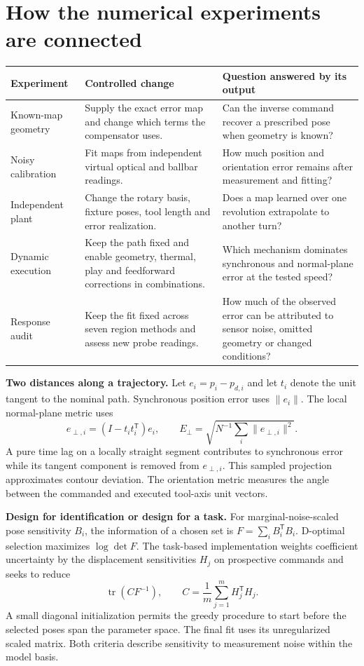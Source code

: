 \clearpage\section{How the numerical experiments are connected}
\begin{center}\small
\begin{tabular}{@{}p{27mm}p{52mm}p{69mm}@{}}\toprule
Experiment & Controlled change & Question answered by its output\\\midrule
Known-map geometry & Supply the exact error map and change which terms the compensator uses. & Can the inverse command recover a prescribed pose when geometry is known?\\
Noisy calibration & Fit maps from independent virtual optical and ballbar readings. & How much position and orientation error remains after measurement and fitting?\\
Independent plant & Change the rotary basis, fixture poses, tool length and error realization. & Does a map learned over one revolution extrapolate to another turn?\\
Dynamic execution & Keep the path fixed and enable geometry, thermal, play and feedforward corrections in combinations. & Which mechanism dominates synchronous and normal-plane error at the tested speed?\\
Response audit & Keep the fit fixed across seven region methods and assess new probe readings. & How much of the observed error can be attributed to sensor noise, omitted geometry or changed conditions?\\\bottomrule
\end{tabular}\end{center}
\textbf{Two distances along a trajectory.} Let $e_i=p_i-p_{d,i}$ and let $t_i$ denote the unit tangent to the nominal path. Synchronous position error uses $\|e_i\|$. The local normal-plane metric uses
\[
 e_{\perp,i}=(I-t_it_i^{\mathsf T})e_i,\qquad
 E_{\perp}=\sqrt{N^{-1}\sum_i\|e_{\perp,i}\|^2}.
\]
A pure time lag on a locally straight segment contributes to synchronous error while its tangent component is removed from $e_{\perp,i}$. This sampled projection approximates contour deviation. The orientation metric measures the angle between the commanded and executed tool-axis unit vectors.

\textbf{Design for identification or design for a task.} For marginal-noise-scaled pose sensitivity $B_i$, the information of a chosen set is $F=\sum_i B_i^{\mathsf T}B_i$. D-optimal selection maximizes $\log\det F$. The task-based implementation weights coefficient uncertainty by the displacement sensitivities $H_j$ on prospective commands and seeks to reduce
\[
 \operatorname{tr}(CF^{-1}),\qquad C=\frac1m\sum_{j=1}^m H_j^{\mathsf T}H_j .
\]
A small diagonal initialization permits the greedy procedure to start before the selected poses span the parameter space. The final fit uses its unregularized scaled matrix. Both criteria describe sensitivity to measurement noise within the model basis.

